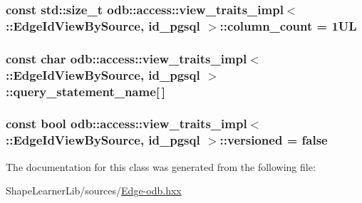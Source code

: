 \subsubsection[{column\+\_\+count}]{\setlength{\rightskip}{0pt plus 5cm}const std\+::size\+\_\+t odb\+::access\+::view\+\_\+traits\+\_\+impl$<$ \+::{\bf Edge\+Id\+View\+By\+Source}, id\+\_\+pgsql $>$\+::column\+\_\+count = 1\+U\+L\hspace{0.3cm}{\ttfamily [static]}}\label{classodb_1_1access_1_1view__traits__impl_3_01_1_1_edge_id_view_by_source_00_01id__pgsql_01_4_a501b59bdb7cfed399be724d26a32ad9e}
\hypertarget{classodb_1_1access_1_1view__traits__impl_3_01_1_1_edge_id_view_by_source_00_01id__pgsql_01_4_a680a9c0bd3a396769122cdaa8425f03e}{}
\subsubsection[{query\+\_\+statement\+\_\+name}]{\setlength{\rightskip}{0pt plus 5cm}const char odb\+::access\+::view\+\_\+traits\+\_\+impl$<$ \+::{\bf Edge\+Id\+View\+By\+Source}, id\+\_\+pgsql $>$\+::query\+\_\+statement\+\_\+name\mbox{[}$\,$\mbox{]}\hspace{0.3cm}{\ttfamily [static]}}\label{classodb_1_1access_1_1view__traits__impl_3_01_1_1_edge_id_view_by_source_00_01id__pgsql_01_4_a680a9c0bd3a396769122cdaa8425f03e}
\hypertarget{classodb_1_1access_1_1view__traits__impl_3_01_1_1_edge_id_view_by_source_00_01id__pgsql_01_4_a88910a1a680e2166fc4a4fb6efa3bf79}{}
\subsubsection[{versioned}]{\setlength{\rightskip}{0pt plus 5cm}const bool odb\+::access\+::view\+\_\+traits\+\_\+impl$<$ \+::{\bf Edge\+Id\+View\+By\+Source}, id\+\_\+pgsql $>$\+::versioned = false\hspace{0.3cm}{\ttfamily [static]}}\label{classodb_1_1access_1_1view__traits__impl_3_01_1_1_edge_id_view_by_source_00_01id__pgsql_01_4_a88910a1a680e2166fc4a4fb6efa3bf79}


The documentation for this class was generated from the following file\+:\begin{DoxyCompactItemize}
\item 
Shape\+Learner\+Lib/sources/\hyperlink{_edge-odb_8hxx}{Edge-\/odb.\+hxx}\end{DoxyCompactItemize}
